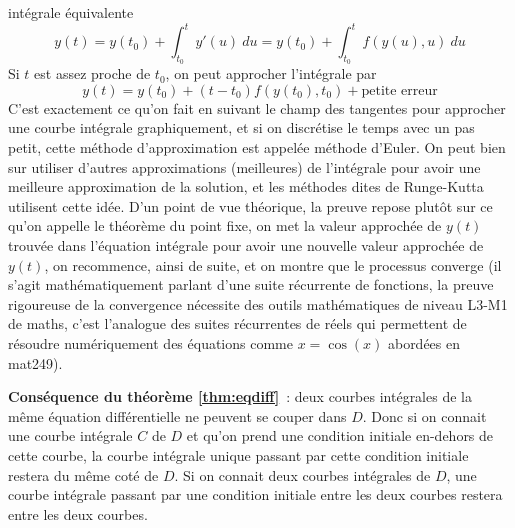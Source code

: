 \documentclass[a4paper,11pt]{article}
\begin{document}
\begin{giacjshere}
int\'egrale \'equivalente 
$$y(t)=y(t_0)+\int_{t_0}^t y'(u) \ du =
 y(t_0)+\int_{t_0}^t f(y(u),u)\ du $$ 
Si $t$ est assez proche de $t_0$, on peut approcher l'int\'egrale par 
$$ y(t) = y(t_0) + (t-t_0) f(y(t_0),t_0) + \mbox{petite erreur}$$
C'est exactement ce qu'on fait en suivant le champ des tangentes
pour approcher une courbe int\'egrale graphiquement, et si on
discr\'etise le temps avec un pas petit, cette m\'ethode
d'approximation est appel\'ee m\'ethode d'Euler. On peut
bien sur utiliser d'autres approximations (meilleures) de
l'int\'egrale pour avoir une meilleure approximation de la solution,
et les m\'ethodes dites de Runge-Kutta utilisent cette id\'ee. D'un
point de vue th\'eorique, la preuve repose plut\^ot sur ce qu'on
appelle le th\'eor\`eme du point fixe, on met la valeur approch\'ee
de $y(t)$ trouv\'ee dans l'\'equation int\'egrale pour avoir
une nouvelle valeur approch\'ee de $y(t)$, on recommence,
ainsi de suite, et on montre que
le processus converge (il s'agit math\'ematiquement parlant
d'une suite r\'ecurrente de fonctions, la preuve rigoureuse
de la convergence n\'ecessite des outils math\'ematiques 
de niveau L3-M1 de maths, c'est l'analogue des suites
r\'ecurrentes de r\'eels qui permettent de r\'esoudre
num\'eriquement des \'equations comme $x=\cos(x)$
abord\'ees en mat249).

{\bf Cons\'equence du th\'eor\`eme \ref{thm:eqdiff}}~: 
deux courbes int\'egrales de la m\^eme \'equation
diff\'erentielle ne peuvent se couper dans $D$. Donc si on connait
une courbe int\'egrale $C$ de $D$ et qu'on prend une condition initiale
en-dehors de cette courbe, la courbe int\'egrale unique passant
par cette condition initiale restera du m\^eme cot\'e de $D$. Si on
connait deux courbes int\'egrales de $D$, une courbe int\'egrale
passant par une condition initiale entre les deux courbes restera
entre les deux courbes.


\end{giacjshere}
\end{document}
